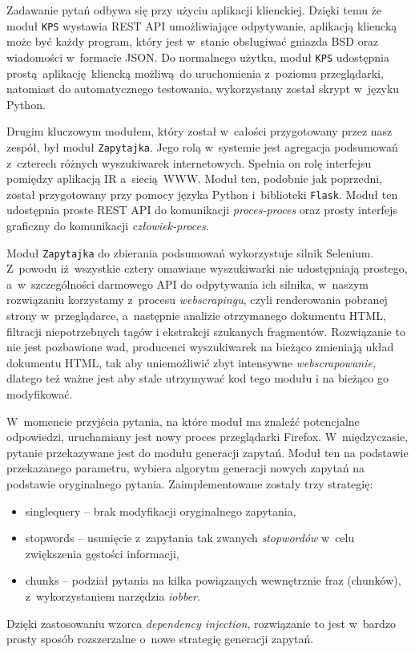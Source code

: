 Zadawanie pytań odbywa się przy użyciu aplikacji klienckiej. Dzięki temu że moduł \texttt{KPS} wystawia REST API umożliwiające odpytywanie, aplikacją kliencką może być każdy program, który jest w~stanie obsługiwać gniazda BSD oraz wiadomości w~formacie JSON. Do normalnego użytku, moduł \texttt{KPS} udostępnia prostą aplikację kliencką możliwą do uruchomienia z~poziomu przeglądarki, natomiast do automatycznego testowania, wykorzystany został skrypt w~języku Python. 

Drugim kluczowym modułem, który został w~całości przygotowany przez nasz zespół, był moduł \texttt{Zapytajka}. Jego rolą w~systemie jest agregacja podsumowań z~czterech różnych wyszukiwarek internetowych. Spełnia on rolę interfejsu pomiędzy aplikacją IR a~siecią~WWW. Moduł ten, podobnie jak poprzedni, został przygotowany przy pomocy języka Python i~biblioteki \texttt{Flask}. Moduł ten udostępnia proste REST API do komunikacji \textit{proces-proces} oraz prosty interfejs graficzny do komunikacji \textit{człowiek-proces}.

Moduł \texttt{Zapytajka} do zbierania podsumowań wykorzystuje silnik Selenium. Z~powodu iż wszystkie cztery omawiane wyszukiwarki nie udostępniają prostego, a~w~szczególności darmowego API do odpytywania ich silnika, w~naszym rozwiązaniu korzystamy z~procesu \textit{webscrapingu}, czyli renderowania pobranej strony w~przeglądarce, a~następnie analizie otrzymanego dokumentu HTML, filtracji niepotrzebnych tagów i ekstrakcji szukanych fragmentów. Rozwiązanie to nie jest pozbawione wad, producenci wyszukiwarek na bieżąco zmieniają układ dokumentu HTML, tak aby uniemożliwić zbyt intensywne \textit{webscrapowanie}, dlatego też ważne jest aby stale utrzymywać kod tego modułu i na bieżąco go modyfikować.

W~momencie przyjścia pytania, na które moduł ma znaleźć potencjalne odpowiedzi, uruchamiany jest nowy proces przeglądarki Firefox. W~międzyczasie, pytanie przekazywane jest do modułu generacji zapytań. Moduł ten na podstawie przekazanego parametru, wybiera algorytm generacji nowych zapytań na podstawie oryginalnego pytania.
Zaimplementowane zostały trzy strategię:
\begin{itemize}
    \item singlequery -- brak modyfikacji oryginalnego zapytania,
    \item stopwords -- usunięcie z~zapytania tak zwanych \textit{stopwordów} w~celu zwiększenia gęstości informacji,
    \item chunks -- podział pytania na kilka powiązanych wewnętrznie fraz (chunków), z~wykorzystaniem narzędzia \textit{iobber}.
\end{itemize}
Dzięki zastosowaniu wzorca \textit{dependency injection}, rozwiązanie to jest w~bardzo prosty sposób rozszerzalne o~nowe strategię generacji zapytań. 

